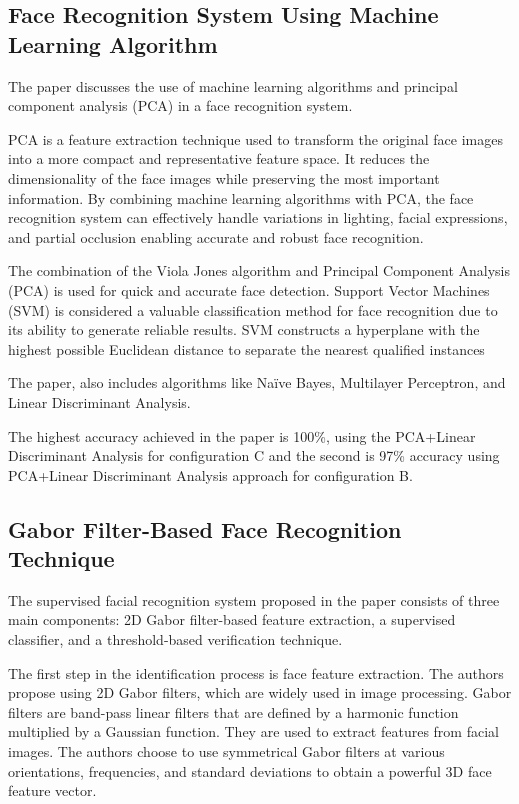 \documentclass[12pt,a4paper,twocolumn]{article}
\begin{document}
\subsection{Face Recognition System Using Machine Learning Algorithm \cite{state1}}
\par The paper discusses the use of machine learning algorithms and principal component analysis (PCA) in a face recognition system. 


\par PCA is a feature extraction technique used to transform the original face images into a more compact and representative feature space. It reduces the dimensionality of the face images while preserving the most important information. 
By combining machine learning algorithms with PCA, the face recognition system can effectively handle variations in lighting, facial expressions, and partial occlusion enabling accurate and robust face recognition.
\par
The combination of the Viola Jones algorithm and Principal Component Analysis (PCA) is used for quick and accurate face detection.
Support Vector Machines (SVM) is considered a valuable classification method for face recognition due to its ability to generate reliable results. SVM constructs a hyperplane with the highest possible Euclidean distance to separate the nearest qualified instances
\par The paper, also includes algorithms like Naïve Bayes, Multilayer Perceptron, and Linear Discriminant Analysis. 
\par The highest accuracy achieved in the paper is 100\%, using the PCA+Linear Discriminant Analysis for configuration C and the second  is 97\% accuracy using PCA+Linear Discriminant Analysis approach for configuration B.
\subsection{Gabor Filter-Based Face Recognition Technique\cite{state2}}
\par The supervised facial recognition system proposed in the paper consists of three main components: 2D Gabor filter-based feature extraction, a supervised classifier, and a threshold-based verification technique.

The first step in the identification process is face feature extraction. The authors propose using 2D Gabor filters, which are widely used in image processing.
Gabor filters are band-pass linear filters that are defined by a harmonic function multiplied by a Gaussian function. They are used to extract features from facial images.
The authors choose to use symmetrical Gabor filters at various orientations, frequencies, and standard deviations to obtain a powerful 3D face feature vector.
\end{document}
